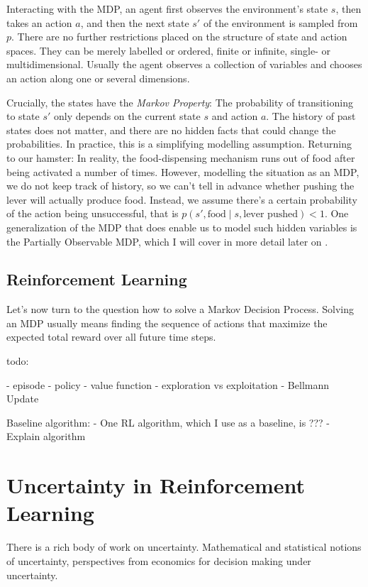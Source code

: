 Interacting with the MDP, an agent first observes the environment's state $s$, then takes an action $a$, and then the next state $s'$ of the environment is sampled from $p$.
There are no further restrictions placed on the structure of state and action spaces. They can be merely labelled or ordered, finite or infinite, single- or multidimensional.
Usually the agent observes a collection of variables and chooses an action along one or several dimensions.

Crucially, the states have the \textit{Markov Property}: The probability of transitioning to state $s'$ only depends on the current state $s$ and action $a$.
The history of past states does not matter, and there are no hidden facts that could change the probabilities.
In practice, this is a simplifying modelling assumption.
Returning to our hamster: In reality, the food-dispensing mechanism runs out of food after being activated a number of times. However, modelling the situation as an MDP, we do not keep track of history, so we can't tell in advance whether pushing the lever will actually produce food. Instead, we assume there's a certain probability of the action being unsuccessful, that is $p(s', \text{food} \mid s, \text{lever pushed}) < 1$.
One generalization of the MDP that does enable us to model such hidden variables is the Partially Observable MDP, which I will cover in more detail later on .

\subsection{Reinforcement Learning}

Let's now turn to the question how to solve a Markov Decision Process. Solving an MDP usually means finding the sequence of actions that maximize the expected total reward over all future time steps.

todo:

- episode
- policy
- value function
- exploration vs exploitation
- Bellmann Update


Baseline algorithm: 
- One RL algorithm, which I use as a baseline, is ???
- Explain algorithm



\section{Uncertainty in Reinforcement Learning}
There is a rich body of work on uncertainty. Mathematical and statistical notions of uncertainty, perspectives from economics for decision making under uncertainty.

